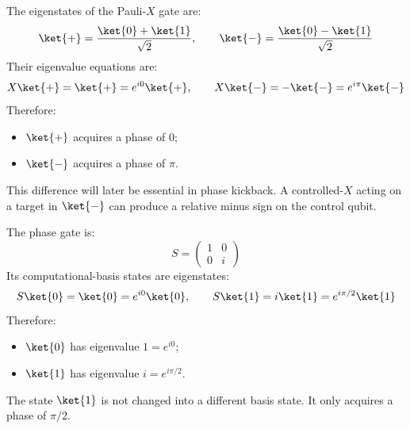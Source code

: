 \highspace
\begin{examplebox}[: Pauli-$X$]
    The eigenstates of the Pauli-$X$ gate are:
    \begin{equation*}
        \ket{+}=\frac{\ket{0}+\ket{1}}{\sqrt{2}},
        \qquad
        \ket{-}=\frac{\ket{0}-\ket{1}}{\sqrt{2}}
    \end{equation*}
    Their eigenvalue equations are:
    \begin{equation*}
        X\ket{+}=\ket{+}=e^{i0}\ket{+},
        \qquad
        X\ket{-}=-\ket{-}=e^{i\pi}\ket{-}
    \end{equation*}
    Therefore:
    \begin{itemize}
        \item $\ket{+}$ acquires a phase of $0$;
        \item $\ket{-}$ acquires a phase of $\pi$.
    \end{itemize}
    This difference will later be essential in phase kickback. A controlled-$X$ acting on a target in $\ket{-}$ can produce a relative minus sign on the control qubit.
\end{examplebox}

\highspace
\begin{examplebox}
    The phase gate is:
    \begin{equation*}
        S=
        \begin{pmatrix}
            1&0\\
            0&i
        \end{pmatrix}
    \end{equation*}
    Its computational-basis states are eigenstates:
    \begin{equation*}
        S\ket{0}=\ket{0}=e^{i0}\ket{0},
        \qquad
        S\ket{1}=i\ket{1}=e^{i\pi/2}\ket{1}
    \end{equation*}
    Therefore:
    \begin{itemize}
        \item $\ket{0}$ has eigenvalue $1=e^{i0}$;
        \item $\ket{1}$ has eigenvalue $i=e^{i\pi/2}$.
    \end{itemize}
    The state $\ket{1}$ is not changed into a different basis state. It only acquires a phase of $\pi/2$.
\end{examplebox}

